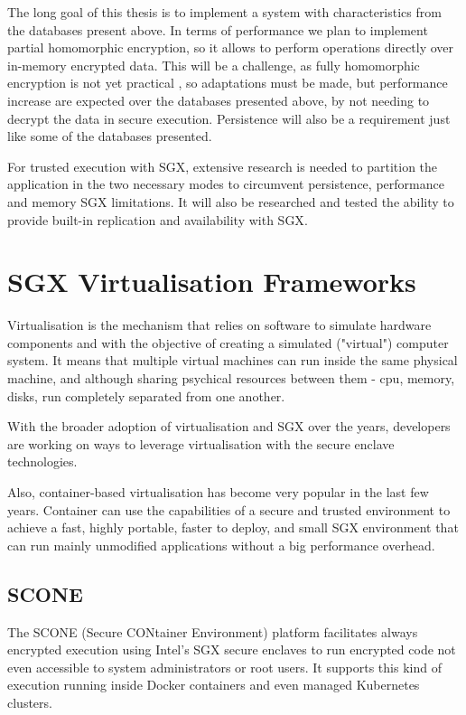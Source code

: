 The long goal of this thesis is to implement a system with characteristics from the databases present above. In terms of performance we plan to implement partial homomorphic encryption, so it allows to perform operations directly over in-memory encrypted data. This will be a challenge, as fully homomorphic encryption is not yet practical \cite{homomorphic:1}, so adaptations must be made, but performance increase are expected  over the databases presented above, by not needing to decrypt the data in secure execution. Persistence will also be a requirement just like some of the databases presented.

For trusted execution with \gls{SGX}, extensive research is needed to partition the application in the two necessary modes to circumvent persistence, performance and memory \gls{SGX} limitations. It will also be researched and tested the ability to provide built-in replication and availability with \gls{SGX}.

\section{SGX Virtualisation Frameworks}
\label{sec:sgx_virtualisation_frameworks}

Virtualisation is the mechanism that relies on software to simulate hardware components and with the objective of creating a simulated ("virtual") computer system. It means that multiple virtual machines can run inside the same physical machine, and although sharing psychical resources between them - cpu, memory, disks, run completely separated from one another.

With the broader adoption of virtualisation and \gls{SGX} over the years, developers are working on ways to leverage virtualisation with the secure enclave technologies.

Also, container-based virtualisation has become very popular in the last few years. Container can use the capabilities of a secure and trusted environment to achieve a fast, highly portable, faster to deploy, and small \gls{SGX} environment that can run mainly unmodified applications without a big performance overhead.

\subsection{SCONE}
\label{ssec:scone}

The SCONE \cite{scone:1} (Secure CONtainer Environment) platform facilitates always encrypted execution using Intel's \gls{SGX} secure enclaves to run encrypted code not even accessible to system administrators or root users. It supports this kind of execution running inside Docker containers and even managed Kubernetes clusters.

